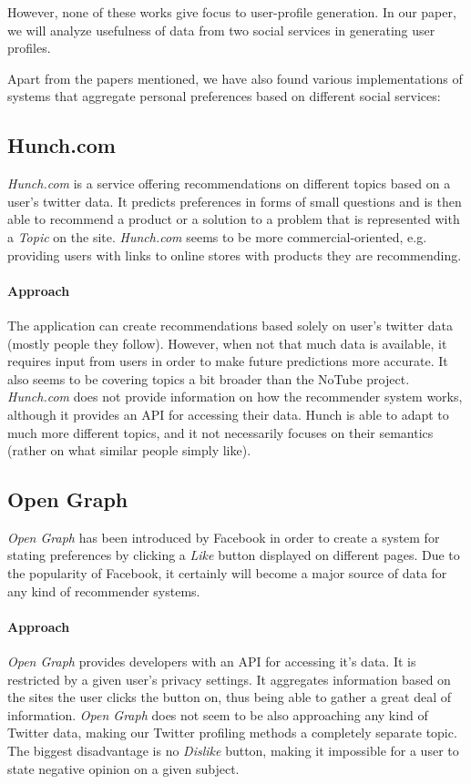 \documentclass{article}
\begin{document}
However, none of these works give focus to user-profile generation. In our
paper, we will analyze usefulness of data from two social services in generating
user profiles.

Apart from the papers mentioned, we have also found various implementations of systems that aggregate personal preferences based on different
social services:

\subsection{Hunch.com}
\textit{Hunch.com} is a service offering recommendations on different topics based on a user's twitter data. It predicts preferences in forms of small questions and is then able to recommend a product or a solution to a problem that is represented with a \textit{Topic} on the site. \textit{Hunch.com} seems to be more commercial-oriented, e.g. providing users with links to online stores with products they are recommending.

\paragraph{Approach}
The application can create recommendations based solely on user's twitter data (mostly people they follow). However, when not that much data is available, it requires input from users in order to make future predictions more accurate. It also seems to be covering topics a bit broader than the NoTube project.
\textit{Hunch.com} does not provide information on how the recommender system works, although it provides an API for accessing their data.
Hunch is able to adapt to much more different topics, and it not necessarily focuses on their semantics (rather on what similar people simply like).

\subsection{Open Graph}
\textit{Open Graph} has been introduced by Facebook in order to create a system for stating preferences by clicking a \textit{Like} button displayed on different pages. Due to the popularity of Facebook, it certainly will become a major source of data for any kind of recommender systems.

\paragraph{Approach}
\textit{Open Graph} provides developers with an API for accessing it's data. It is restricted by a given user's privacy settings.
It aggregates information based on the sites the user clicks the button on, thus being able to gather a great deal of information. \textit{Open Graph} does not seem to be also approaching any kind of Twitter data, making our Twitter profiling methods a completely separate topic.
The biggest disadvantage is no \textit{Dislike} button, making it impossible for a user to state negative opinion on a given subject.
\end{document}
